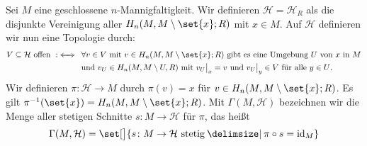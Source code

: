 \begin{definition}[{name=[{Disjunkte Vereinigung der Homologieklassen}]}]
	Sei $M$ eine geschlossene $n$-Mannigfaltigkeit. 
	Wir definieren $\mathcal{H}=\mathcal{H}_R$ als die disjunkte Vereinigung aller $H_n(M,M\setminus \set{x};R)$ mit $x \in M$. 
	Auf $\mathcal{H}$ definieren wir nun eine Topologie  durch:
	\begin{align*}
		V \subseteq \mathcal{H} \text{ offen } :\iff \enspace& \forall v \in V \text{ mit } v \in H_n(M,M \setminus \set{x};R) \text{ gibt es eine Umgebung $U$ von $x$ in $M$}\\
		&\text{und $v_U \in H_n(M,M \setminus U,R)$ mit } v_U\big|_x=v \text{ und } v_U\big|_y \in V \text{ für alle $y \in U$.}
	\end{align*}
	Wir definieren $\pi \colon \mathcal{H} \to M$ durch $\pi(v)=x$ für $v \in H_n(M,M \setminus \set{x};R)$. 
	Es gilt $\pi ^{-1}(\set{x})= H_n(M,M \setminus \set{x};R)$.
	Mit $\Gamma(M,\mathcal{H})$ bezeichnen wir die Menge aller stetigen Schnitte $s\colon M \to \mathcal{H}$ für $\pi$, das heißt 
	\[
		\Gamma(M,\mathcal{H})= \set[\big]{s \colon M \to \mathcal{H} \text{ stetig} \given \pi  \circ s =\id_M} 
	\]
\end{definition}

